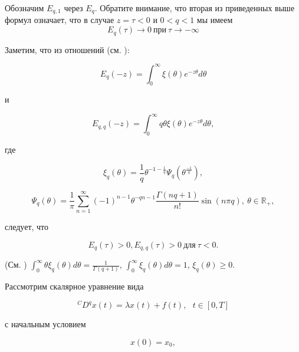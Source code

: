 Обозначим $E_{q,1}$ через $E_{q}$. Обратите внимание, что вторая из приведенных выше формул означает, что в случае
$z = \tau < 0$ и $0 < q < 1$ мы имеем
\begin{equation}
    E_{q}(\tau) \rightarrow 0 \ \text{при} \ \tau \rightarrow - \infty
\end{equation}

Заметим, что из отношений (см. \cite{wang}):

\begin{equation*}
    E_{q}(-z) = \int_{0}^{\infty} \xi(\theta)e^{-z\theta}d\theta
\end{equation*}

\noindent и

\begin{equation*}
    E_{q,q}(-z) = \int_{0}^{\infty} q\theta \xi(\theta)e^{-z\theta}d\theta,
\end{equation*}

\noindent где

\begin{equation}
    \xi_{q}(\theta) = \frac{1}{q} \theta^{-1-\frac{1}{q}}\Psi_{q}(\theta^{\frac{-1}{q}}),
\end{equation}

\begin{equation}
    \Psi_{q}(\theta) = \frac{1}{\pi} \sum_{n=1}^{\infty} (-1)^{n-1} \theta^{-qn-1} \frac{\Gamma(nq+1)}{n!} \sin(n \pi q), \ 
    \theta \in \mathbb{R}_{+},
\end{equation}

\noindent следует, что

\begin{equation}
    E_{q}(\tau) > 0, E_{q,q}(\tau) > 0 \ \text{для} \ \tau < 0.
\end{equation}

\begin{remark}
    (См. \cite{zhang}) $\int_{0}^{\infty} \theta \xi_{q}(\theta) d\theta = \frac{1}{\Gamma(q+1)}$,
    $\int_{0}^{\infty} \xi_{q}(\theta) d\theta = 1$, $\xi_{q}(\theta) \geq 0$.
\end{remark}

Рассмотрим скалярное уравнение вида

\begin{equation}
    \label{eq:dxt}
    {}^{C}D^{q} x(t) = \lambda x(t) + f(t), \ \ \ t \in [0, T]
\end{equation}

\noindent с начальным условием

\begin{equation}
    \label{eq:dxt_x0}
    x(0) = x_{0},
\end{equation}

